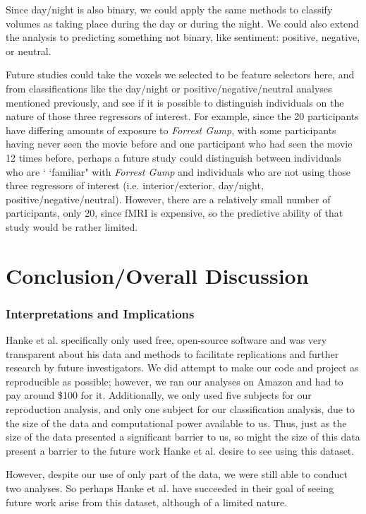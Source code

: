 \documentclass[11pt]{article}
\begin{document}
Since day/night is also binary, we could apply the same methods to classify volumes
as taking place during the day or during the night.  We could also extend the 
analysis to predicting something not binary, like sentiment: positive, negative, or
neutral.

Future studies could take the voxels we selected to be feature selectors here, and
from classifications like the day/night or positive/negative/neutral analyses mentioned previously, and see if it is possible to distinguish individuals on the nature of those three regressors of interest.  For example, since the 20 participants have differing amounts of exposure to \emph{Forrest 
Gump}, with some participants having never seen the movie before and one 
participant who had seen the movie 12 times before, perhaps a future study could 
distinguish between individuals who are ` `familiar" with \emph{Forrest Gump} and individuals who are not using those three regressors of interest (i.e. interior/exterior, day/night, positive/negative/neutral).  However, there
are a relatively small number of participants, only 20, since fMRI is
expensive, so the predictive ability of that study would be rather limited.

\section{Conclusion/Overall Discussion}

\subsubsection{Interpretations and Implications}

Hanke et al. specifically only used free, open-source software and was very 
transparent about his data and methods to facilitate 
replications and further research by future investigators\cite{hank2014audiomovie}.  We did attempt to make our code and project as reproducible as
possible; however, we ran our analyses on Amazon and had to pay around \$100
for it.  Additionally, we only used five subjects for our reproduction analysis,
and only one subject for our classification analysis, due to the size of the data
and computational power available to us.  Thus, just as the size of the data presented a significant barrier to us, so might the size of this data present a 
barrier to the future work Hanke et al. desire to see using this dataset.

However, despite our use of only part of the data, we were still able to conduct
two analyses.  So perhaps Hanke et al. have succeeded in their goal of seeing 
future work arise from this dataset, although of a limited nature.


\end{document}
